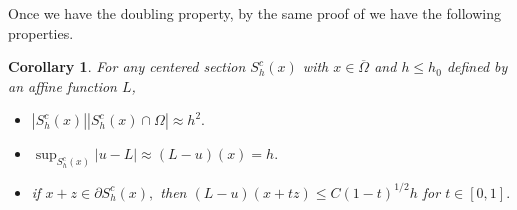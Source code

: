 \documentclass[11pt]{amsart}
\theoremstyle{plain}
\newtheorem{corollary}{Corollary}[section]
\newcommand{\0}{\textbf{0}}
\numberwithin{equation}{section}
\numberwithin{equation}{section}
\numberwithin{figure}{section}
\begin{document}
	
	
	
	
	Once we have the doubling property, by the same proof of \cite[Lemma 2.4 and Corollary 2.1]{C96} we have the following properties.
	\begin{corollary}\label{prop}
		For any centered section $S_h^c(x)$ with $x\in \overline{\Omega}$ and $h\leq h_0$ defined by an affine function $L$,
		\begin{itemize}
			\item[(a)] $|S_h^c(x)||S_h^c(x)\cap\Omega|\approx h^2.$
			
			\item[(b)] $\sup_{S_h^c(x)}|u-L|\approx (L-u)(x)=h.$
			
			\item[(c)] if $x+z\in \partial S_h^c(x),$ then $(L-u)(x+tz)\leq C(1-t)^{1/2}h$ for $t\in [0,1].$
			
		\end{itemize}
	\end{corollary}
		
	
\end{document}
